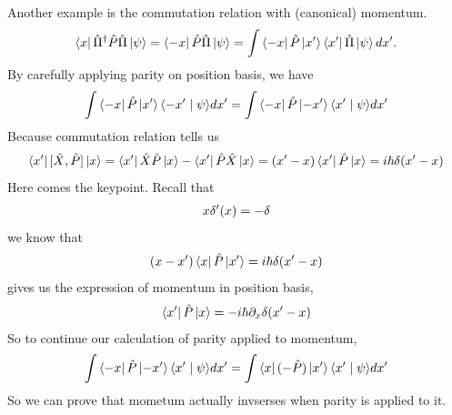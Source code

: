 \documentclass[letterpaper,10pt,english]{sphinxmanual}
\newcommand{\bra}[1]{\left\langle #1\right|}
\newcommand{\ket}[1]{\left| #1\right\rangle}
\newcommand{\braket}[2]{\langle #1 \mid #2 \rangle}
\begin{document}
\begin{enumerate}
Another example is the commutation relation with (canonical) momentum.
\begin{gather}
\begin{split}\bra{x}\hat \Pi^\dagger \hat P \hat \Pi \ket{\psi} = \bra{-x} \hat P \hat \Pi\ket{\psi} = \int \bra{-x}\hat P \ket{x'}\bra{x'}\hat \Pi\ket{\psi} dx'  .\end{split}\notag
\end{gather}
By carefully applying parity on position basis, we have
\begin{gather}
\begin{split}\int \bra{-x}\hat P \ket{x'}\braket{-x'}{\psi} d x' = \int \bra{-x}\hat P \ket{-x'}\braket{x'}{\psi} d x'\end{split}\notag
\end{gather}
Because commutation relation tells us
\begin{gather}
\begin{split}\bra{x'}[\hat X,\hat P]\ket{x} = \bra{x'}\hat X \hat P\ket{x} - \bra{x'}\hat P \hat X\ket{x} = (x' - x)\bra{x'}\hat P\ket{x} = i\hbar \delta(x'-x)\end{split}\notag
\end{gather}
Here comes the keypoint. Recall that
\begin{gather}
\begin{split}x\delta'(x) = -\delta\end{split}\notag
\end{gather}
we know that
\begin{gather}
\begin{split}(x - x')\bra{x}\hat P\ket{x'} = i\hbar \delta(x'-x)\end{split}\notag
\end{gather}
gives us the expression of momentum in position basis,
\begin{gather}
\begin{split}\bra{x'}\hat P \ket{x} = -i\hbar \partial_x \delta(x'-x)\end{split}\notag
\end{gather}
So to continue our calculation of parity applied to momentum,
\begin{gather}
\begin{split}\int \bra{-x}\hat P \ket{-x'}\braket{x'}{\psi} d x' = \int \bra{x}(-\hat P)\ket{x'}\braket{x'}{\psi}dx'\end{split}\notag
\end{gather}
So we can prove that mometum actually invserses when parity is applied to it.

\end{enumerate}
\end{document}
